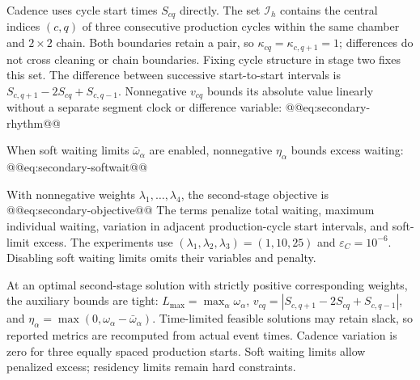 Cadence uses cycle start times $S_{cq}$ directly. The set $\mathcal I_h$ contains the central indices $(c,q)$ of three consecutive production cycles within the same chamber and $2\times2$ chain. Both boundaries retain a pair, so $\kappa_{cq}=\kappa_{c,q+1}=1$; differences do not cross cleaning or chain boundaries. Fixing cycle structure in stage two fixes this set. The difference between successive start-to-start intervals is $S_{c,q+1}-2S_{cq}+S_{c,q-1}$. Nonnegative $v_{cq}$ bounds its absolute value linearly without a separate segment clock or difference variable:
@@eq:secondary-rhythm@@

When soft waiting limits $\bar\omega_\alpha$ are enabled, nonnegative $\eta_\alpha$ bounds excess waiting:
@@eq:secondary-softwait@@

With nonnegative weights $\lambda_1,\ldots,\lambda_4$, the second-stage objective is
@@eq:secondary-objective@@
The terms penalize total waiting, maximum individual waiting, variation in adjacent production-cycle start intervals, and soft-limit excess. The experiments use $(\lambda_1,\lambda_2,\lambda_3)=(1,10,25)$ and $\varepsilon_C=10^{-6}$. Disabling soft waiting limits omits their variables and penalty.

At an optimal second-stage solution with strictly positive corresponding weights, the auxiliary bounds are tight: $L_{\max}=\max_\alpha\omega_\alpha$, $v_{cq}=|S_{c,q+1}-2S_{cq}+S_{c,q-1}|$, and $\eta_\alpha=\max(0,\omega_\alpha-\bar\omega_\alpha)$. Time-limited feasible solutions may retain slack, so reported metrics are recomputed from actual event times. Cadence variation is zero for three equally spaced production starts. Soft waiting limits allow penalized excess; residency limits remain hard constraints.

